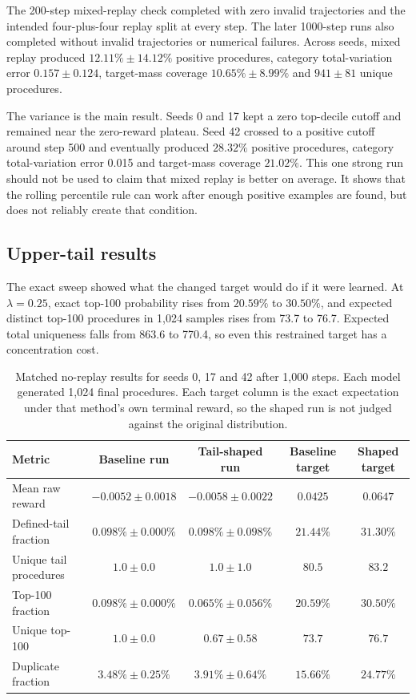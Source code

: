 \documentclass{article}
\begin{document}
The 200-step mixed-replay check completed with zero invalid trajectories and the intended four-plus-four replay split at every step. The later 1000-step runs also completed without invalid trajectories or numerical failures. Across seeds, mixed replay produced $12.11\%\pm14.12\%$ positive procedures, category total-variation error $0.157\pm0.124$, target-mass coverage $10.65\%\pm8.99\%$ and $941\pm81$ unique procedures.

The variance is the main result. Seeds 0 and 17 kept a zero top-decile cutoff and remained near the zero-reward plateau. Seed 42 crossed to a positive cutoff around step 500 and eventually produced $28.32\%$ positive procedures, category total-variation error 0.015 and target-mass coverage $21.02\%$. This one strong run should not be used to claim that mixed replay is better on average. It shows that the rolling percentile rule can work after enough positive examples are found, but does not reliably create that condition.

\subsection{Upper-tail results}

The exact sweep showed what the changed target would do if it were learned. At $\lambda=0.25$, exact top-100 probability rises from $20.59\%$ to $30.50\%$, and expected distinct top-100 procedures in 1,024 samples rises from 73.7 to 76.7. Expected total uniqueness falls from 863.6 to 770.4, so even this restrained target has a concentration cost.

\begin{table}[htbp]
\centering
\small
\begin{tabular}{l c c c c}
\hline
Metric & Baseline run & Tail-shaped run & Baseline target & Shaped target \\
\hline
Mean raw reward & $-0.0052\pm0.0018$ & $-0.0058\pm0.0022$ & $0.0425$ & $0.0647$ \\
Defined-tail fraction & $0.098\%\pm0.000\%$ & $0.098\%\pm0.098\%$ & $21.44\%$ & $31.30\%$ \\
Unique tail procedures & $1.0\pm0.0$ & $1.0\pm1.0$ & $80.5$ & $83.2$ \\
Top-100 fraction & $0.098\%\pm0.000\%$ & $0.065\%\pm0.056\%$ & $20.59\%$ & $30.50\%$ \\
Unique top-100 & $1.0\pm0.0$ & $0.67\pm0.58$ & $73.7$ & $76.7$ \\
Duplicate fraction & $3.48\%\pm0.25\%$ & $3.91\%\pm0.64\%$ & $15.66\%$ & $24.77\%$ \\
\hline
\end{tabular}
\caption{Matched no-replay results for seeds 0, 17 and 42 after 1,000 steps. Each model generated 1,024 final procedures. Each target column is the exact expectation under that method's own terminal reward, so the shaped run is not judged against the original distribution.}
\label{tab:upper-tail-results}
\end{table}
\end{document}
